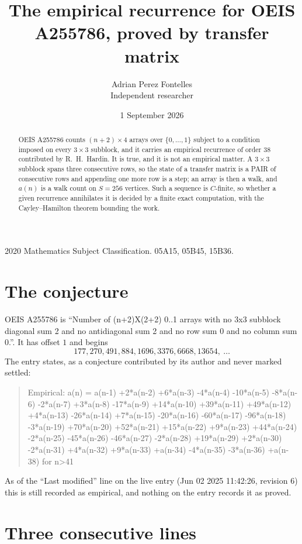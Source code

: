 \documentclass[11pt,a4paper]{article}
\title{The empirical recurrence for OEIS A255786, proved by transfer matrix}
\author{Adrian Perez Fontelles\\ \small Independent researcher}
\date{1 September 2026}
\theoremstyle{plain}
\theoremstyle{definition}
\begin{document}
\maketitle

\begin{abstract}
OEIS A255786 counts $(n+2)\times4$ arrays over $\{0,\dots,1\}$ subject to a condition imposed on
every $3\times3$ subblock, and it carries an empirical recurrence of order $38$
contributed by R.~H.~Hardin. It is true, and it is not an empirical matter. A $3\times3$
subblock spans three consecutive rows, so the state of a transfer matrix is a PAIR of
consecutive rows and appending one more row is a step; an array is then a walk, and
$a(n)$ is a walk count on $S=256$ vertices. Such a sequence is $C$-finite, so whether a given
recurrence annihilates it is decided by a finite exact computation, with the Cayley--Hamilton
theorem bounding the work.
\end{abstract}

\noindent\small 2020 Mathematics Subject Classification. 05A15, 05B45, 15B36.\normalsize

\section{The conjecture}

OEIS A255786 is ``Number of (n+2)X(2+2) 0..1 arrays with no 3x3 subblock diagonal sum 2 and no antidiagonal sum 2 and no row sum 0 and no column sum 0.''. It has offset $1$ and begins
\[
177, 270, 491, 884, 1696, 3376, 6668, 13654,\ \dots
\]
The entry states, as a conjecture contributed by its author and never marked settled:
\begin{quote}
Empirical: a(n) = a(n-1) +2*a(n-2) +6*a(n-3) -4*a(n-4) -10*a(n-5) -8*a(n-6) -2*a(n-7) +3*a(n-8) -17*a(n-9) +14*a(n-10) +39*a(n-11) +49*a(n-12) +4*a(n-13) -26*a(n-14) +7*a(n-15) -20*a(n-16) -60*a(n-17) -96*a(n-18) -3*a(n-19) +70*a(n-20) +52*a(n-21) +15*a(n-22) +9*a(n-23) +44*a(n-24) -2*a(n-25) -45*a(n-26) -46*a(n-27) -2*a(n-28) +19*a(n-29) +2*a(n-30) -2*a(n-31) +4*a(n-32) +9*a(n-33) +a(n-34) -4*a(n-35) -3*a(n-36) +a(n-38) for n>41
\end{quote}
As of the ``Last modified'' line on the live entry (Jun 02 2025 11:42:26, revision 6) this is still
recorded as empirical, and nothing on the entry records it as proved.

\section{Three consecutive lines}
\end{document}
